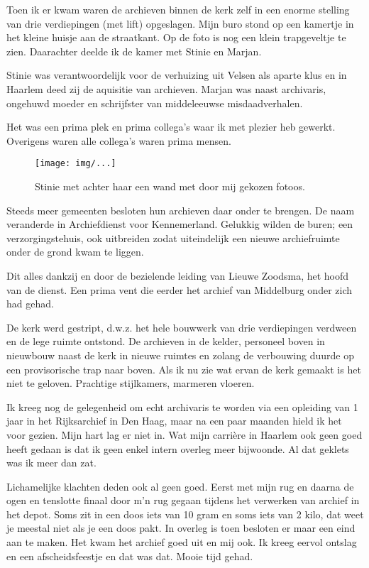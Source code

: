 \documentclass[10pt,twoside,openright]{memoir}
\begin{document}
Toen ik er kwam waren de archieven binnen de kerk zelf in een enorme stelling van drie verdiepingen (met lift) opgeslagen. Mijn buro stond op een kamertje in het kleine huisje aan de straatkant. Op de foto is nog een klein trapgeveltje te zien. Daarachter deelde ik de kamer met Stinie en Marjan. 

Stinie was verantwoordelijk voor de verhuizing uit Velsen als aparte klus en in Haarlem deed zij de aquisitie van archieven. Marjan was naast archivaris, ongehuwd moeder en schrijfster van middeleeuwse misdaadverhalen.

Het was een prima plek en prima collega’s waar ik met plezier heb gewerkt. Overigens waren alle collega’s waren prima mensen. 

\begin{figure}[t]
\texttt{[image: img/...]}
\caption{Stinie met achter haar een wand met door mij gekozen fotoos.}
\end{figure}

Steeds meer gemeenten besloten hun archieven daar onder te brengen. De naam veranderde in Archiefdienst voor Kennemerland. Gelukkig wilden de buren; een verzorgingstehuis, ook uitbreiden zodat uiteindelijk een nieuwe archiefruimte onder de grond kwam te liggen. 

Dit alles dankzij en door de bezielende leiding van Lieuwe Zoodsma, het hoofd van de dienst. Een prima vent die eerder het archief van Middelburg onder zich had gehad.

De kerk werd gestript, d.w.z. het hele bouwwerk van drie verdiepingen verdween en de lege ruimte ontstond. De archieven in de kelder, personeel boven in nieuwbouw naast de kerk in nieuwe ruimtes en zolang de verbouwing duurde op een provisorische trap naar boven. Als ik nu zie wat ervan de kerk gemaakt is het niet te geloven. Prachtige stijlkamers, marmeren vloeren.

Ik kreeg nog de gelegenheid om echt archivaris te worden via een opleiding van 1 jaar in het Rijksarchief in Den Haag, maar na een paar maanden hield ik het voor gezien. Mijn hart lag er niet in. Wat mijn carrière in Haarlem ook geen goed heeft gedaan is dat ik geen enkel intern overleg meer bijwoonde. Al dat geklets was ik meer dan zat. 

Lichamelijke klachten deden ook al geen goed. Eerst met mijn rug en daarna de ogen en tenslotte finaal door m’n rug gegaan tijdens het verwerken van archief in het depot. Soms zit in een doos iets van 10 gram en soms iets van 2 kilo, dat weet je meestal niet als je een doos pakt. In overleg is toen besloten er maar een eind aan te maken. Het kwam het archief goed uit en mij ook. Ik kreeg eervol ontslag en een afscheidsfeestje en dat was dat. Mooie tijd gehad.
\end{document}
